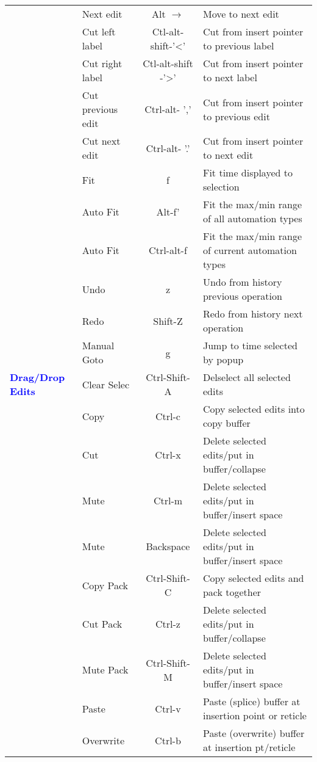\begin{center}
\begin{longtable}{ >{\bfseries}p{2cm} l c p{6cm}}
        & Next edit & Alt $\rightarrow$ & Move to next edit \\        
        & Cut left label & Ctl-alt-shift-'<' & Cut from insert pointer to previous label \\        
        & Cut right label & Ctl-alt-shift -'>' & Cut from insert pointer to next label \\        
        & Cut previous edit & Ctrl-alt- ',' & Cut from insert pointer to previous edit \\        
        & Cut next edit & Ctrl-alt- '.' & Cut from insert pointer to next edit \\        
        & Fit & f & Fit time displayed to selection \\        
        & Auto Fit & Alt-f' & Fit the max/min range of all automation types \\        
        & Auto Fit & Ctrl-alt-f & Fit the max/min range of current automation types \\        
        & Undo & z & Undo from history previous operation \\        
        & Redo & Shift-Z & Redo from history next operation \\        
        & Manual Goto & g & Jump to time selected by popup \\
        \midrule
        \textcolor{blue}{Drag/Drop Edits} & Clear Selec & Ctrl-Shift-A & Delselect all selected edits \\        
        & Copy & Ctrl-c & Copy selected edits into copy buffer \\        
        & Cut & Ctrl-x & Delete selected edits/put in buffer/collapse \\        
        & Mute & Ctrl-m & Delete selected edits/put in buffer/insert space \\        
        & Mute & Backspace & Delete selected edits/put in buffer/insert space \\        
        & Copy Pack & Ctrl-Shift-C & Copy selected edits and pack together \\        
        & Cut Pack & Ctrl-z & Delete selected edits/put in buffer/collapse \\        
        & Mute Pack & Ctrl-Shift-M & Delete selected edits/put in buffer/insert space \\        
        & Paste & Ctrl-v & Paste (splice) buffer at insertion point or reticle \\        
        & Overwrite & Ctrl-b & Paste (overwrite) buffer at insertion pt/reticle \\        

\end{longtable}
\end{center}
